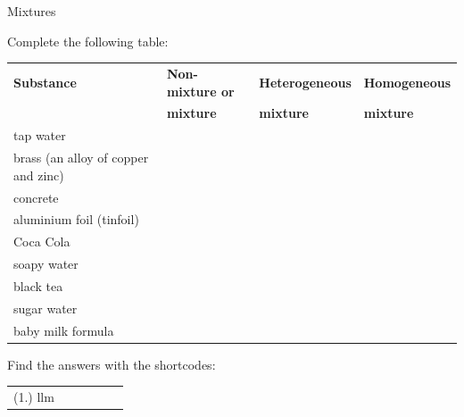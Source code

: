 \label{m38708*secfhsst!!!underscore!!!id169}
\begin{exercises}{Mixtures}
{Complete the following table: \par
\begin{tabular}{|l|l|l|l|}\hline
\textbf{Substance} & \textbf{Non-mixture or} & \textbf{Heterogeneous} & \textbf{Homogeneous} \\ 
 & \textbf{mixture} & \textbf{mixture} & \textbf{mixture} \\ \hline
tap water & & & \\ \hline
brass (an alloy of copper and zinc) & & & \\ \hline
concrete & & & \\ \hline
aluminium foil (tinfoil) & & & \\ \hline
Coca Cola & & & \\ \hline
soapy water & & & \\ \hline
black tea & & & \\ \hline
sugar water & & & \\ \hline
baby milk formula & & & \\ \hline
\end{tabular}
    \label{m38708*cid3}
\par {} Find the answers with the shortcodes:
 \par \begin{tabular}[h]{cccccc}
 (1.) llm  & \end{tabular} }
\end{exercises}
